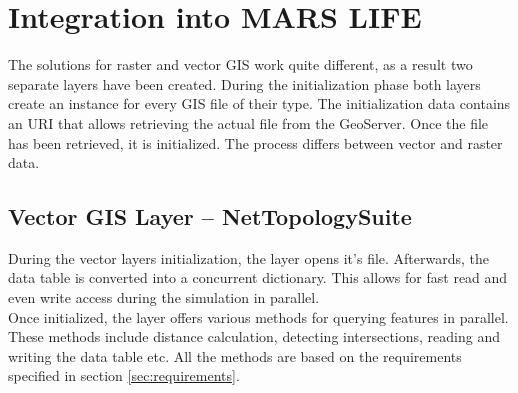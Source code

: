 \section{Integration into MARS LIFE}
The solutions for raster and vector GIS work quite different, as a result two separate layers have been created. During the initialization phase both layers create an instance for every GIS file of their type. The initialization data contains an URI that allows retrieving the actual file from the GeoServer. Once the file has been retrieved, it is initialized. The process differs between vector and raster data.


\subsection{Vector GIS Layer -- NetTopologySuite}
During the vector layers initialization, the layer opens it's file. Afterwards, the data table is converted into a concurrent dictionary. This allows for fast read and even write access during the simulation in parallel.\\
Once initialized, the layer offers various methods for querying features in parallel. These methods include distance calculation, detecting intersections, reading and writing the data table etc. All the methods are based on the requirements specified in section \ref{sec:requirements}.


